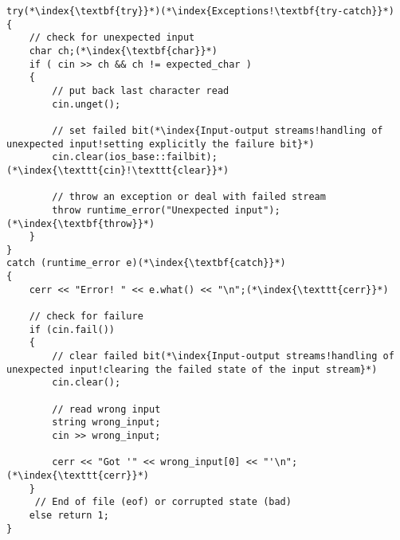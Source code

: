 \documentclass[10pt]{article}
\begin{document}
\begin{lstlisting}
try(*\index{\textbf{try}}*)(*\index{Exceptions!\textbf{try-catch}}*)
{
    // check for unexpected input
    char ch;(*\index{\textbf{char}}*)
    if ( cin >> ch && ch != expected_char )
    {
        // put back last character read
        cin.unget();
        
        // set failed bit(*\index{Input-output streams!handling of unexpected input!setting explicitly the failure bit}*)
        cin.clear(ios_base::failbit);(*\index{\texttt{cin}!\texttt{clear}}*)
    
        // throw an exception or deal with failed stream
        throw runtime_error("Unexpected input");(*\index{\textbf{throw}}*)
    }
}
catch (runtime_error e)(*\index{\textbf{catch}}*)
{
    cerr << "Error! " << e.what() << "\n";(*\index{\texttt{cerr}}*)
            
    // check for failure
    if (cin.fail())
    {
        // clear failed bit(*\index{Input-output streams!handling of unexpected input!clearing the failed state of the input stream}*)
        cin.clear();
                
        // read wrong input
        string wrong_input;
        cin >> wrong_input;
                    
        cerr << "Got '" << wrong_input[0] << "'\n";(*\index{\texttt{cerr}}*)
    }
     // End of file (eof) or corrupted state (bad)
    else return 1;
}
\end{lstlisting}
%
%
\end{document}

